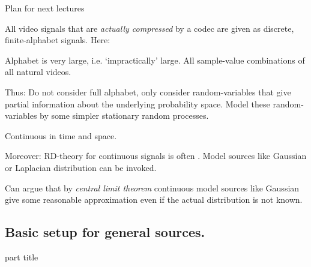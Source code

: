 \begin{frame}{Plan for next lectures}

\bit
\item All video signals that are \textit{actually compressed} by a codec are given as discrete, finite-alphabet 
signals. Here:
\bit
\item Alphabet is very large, i.e. `impractically' large. All sample-value combinations of all natural 
videos.  
\item Thus: Do not consider full alphabet, only consider random-variables that give partial information about
the underlying probability space. Model these random-variables by some simpler stationary random processes. 
\eit
\item {} Continuous 
in time and space.
\item Moreover: RD-theory for continuous signals is often . Model sources like Gaussian or 
Laplacian distribution can be invoked. 
\item Can argue that by \textit{central limit theorem} continuous model sources like Gaussian give some reasonable approximation even if the actual distribution is not known.
\eit 
\end{frame}



\subsection{Basic setup for general sources.} 
\begin{frame}
 \vspace{12.0ex}
\begin{center}
\begin{beamercolorbox}[sep=12pt,center]{part title}
\insertsubsection\par
\end{beamercolorbox}
\end{center}
\end{frame}




